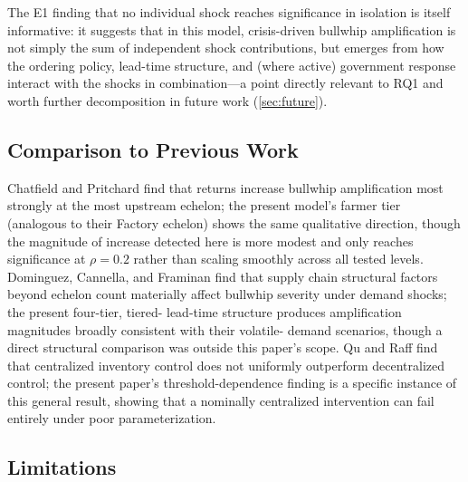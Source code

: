 \documentclass[final,onefignum,onetabnum]{siuro250211}
\begin{document}
The E1 finding that no individual shock reaches significance in isolation is itself informative:
it suggests that in this model, crisis-driven bullwhip amplification is not simply the sum of
independent shock contributions, but emerges from how the ordering policy, lead-time structure,
and (where active) government response interact with the shocks in combination---a point directly
relevant to RQ1 and worth further decomposition in future work (\cref{sec:future}).

\subsection{Comparison to Previous Work}

Chatfield and Pritchard \cite{ChatfieldPritchard2013} find that returns increase bullwhip
amplification most strongly at the most upstream echelon; the present model's farmer tier
(analogous to their Factory echelon) shows the same qualitative direction, though the magnitude of
increase detected here is more modest and only reaches significance at $\rho=0.2$ rather than
scaling smoothly across all tested levels. Dominguez, Cannella, and Framinan
\cite{DominguezCannellaFraminan2015} find that supply chain structural factors beyond echelon
count materially affect bullwhip severity under demand shocks; the present four-tier, tiered-
lead-time structure produces amplification magnitudes broadly consistent with their volatile-
demand scenarios, though a direct structural comparison was outside this paper's scope. Qu and
Raff \cite{QuRaff2017} find that centralized inventory control does not uniformly outperform
decentralized control; the present paper's threshold-dependence finding is a specific instance of
this general result, showing that a nominally centralized intervention can fail entirely under
poor parameterization.

\subsection{Limitations}
\end{document}
